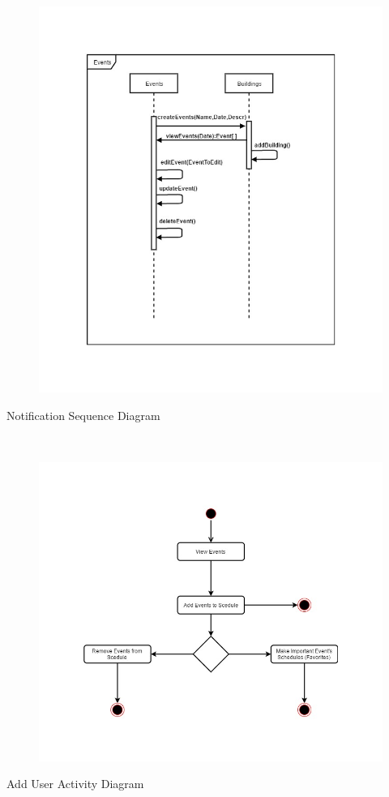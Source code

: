 \documentclass{article}
\begin{document}
    \mbox{}\\
    \bigskip
    \clearpage
    
    \begin{figure}[h!]
        \includegraphics[width=\textwidth]{Images/EventsSequence.jpg}
    \end{figure}
    Notification Sequence Diagram
    
    \mbox{}\\
    \bigskip
    \clearpage
    
    \begin{figure}[h!]
        \includegraphics[width=\textwidth]{Images/ActivityDiagramUser.jpg}
    \end{figure}
    Add User Activity Diagram
    
\end{document}
